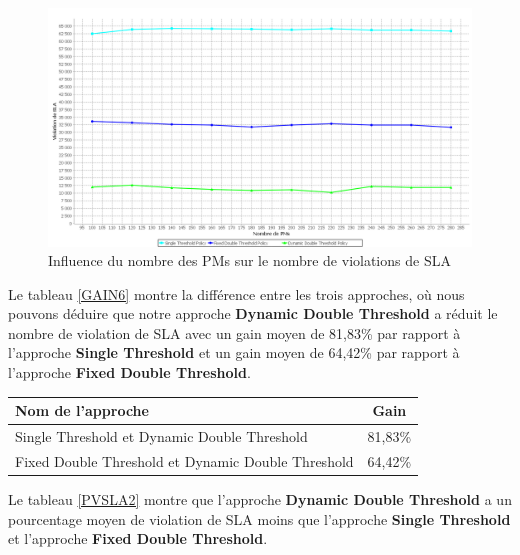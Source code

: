 \begin{onehalfspace}
\begin{figure}[!h]
\begin{center}
\includegraphics[scale=0.35]{figures/sh6.png} 
\end{center}
\caption{Influence du nombre des PMs sur le nombre de violations de SLA}
\label{InNVMEV1}
\end{figure}

Le tableau \ref{GAIN6} montre la différence entre les trois approches, où nous pouvons déduire que notre approche \textbf{Dynamic Double Threshold} a réduit le nombre de violation de SLA avec un gain moyen de 81,83\% par rapport à l'approche \textbf{Single Threshold} et un gain moyen de 64,42\% par rapport à l'approche \textbf{Fixed Double Threshold}.\\ 
\begin{center}
{\scriptsize   \begin{tabular}{|p{3.5cm}|c|}
\hline
      \centering      Nom de l’approche&  Gain\\
\hline
      \centering      Single Threshold et Dynamic Double Threshold&  81,83\%\\
\hline
      \centering      Fixed Double Threshold et Dynamic Double Threshold&  64,42\%\\
\hline
\end{tabular}}
\label{GAIN6}
\end{center}

Le tableau \ref{PVSLA2} montre que l’approche \textbf{Dynamic Double Threshold} a un pourcentage moyen de violation de SLA moins que l’approche \textbf{Single Threshold} et l’approche \textbf{Fixed Double Threshold}.


\end{onehalfspace}
